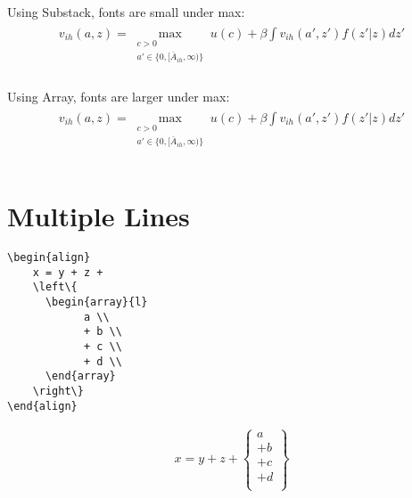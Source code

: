 \documentclass[12pt,english]{article}
\begin{document}
Using Substack, fonts are small under max:
\begin{align}
    \begin{split}
        \label{eq:Value}
        v_{ih}\left(a,z\right)
        =
        \max_{
            \substack{
                c>0\\
                a' \in \{0,[\bar{A}_{ih},\infty)\}
                }
            }
        u\left(c\right)+  \beta \int v_{ih}\left(a',z'\right)f(z'|z)dz'\\
    \end{split}
\end{align}

Using Array, fonts are larger under max:
\begin{align}
    \begin{split}
        \label{eq:Value}
        v_{ih}\left(a,z\right)
        =
        \max_{
            \begin{array}{cc}
                c>0\\
                a' \in \{0,[\bar{A}_{ih},\infty)\}\\
            \end{array}
            }
        u\left(c\right)+  \beta \int v_{ih}\left(a',z'\right)f(z'|z)dz'\\
    \end{split}
\end{align}

\pagebreak

\section{Multiple Lines}

\begin{verbatim}
\begin{align}
    x = y + z +
    \left\{
      \begin{array}{l}
            a \\
            + b \\
            + c \\
            + d \\
      \end{array}
    \right\}
\end{align}
\end{verbatim}

\begin{align}
    x = y + z +
    \left\{
      \begin{array}{l}
            a \\
            + b \\
            + c \\
            + d \\
      \end{array}
    \right\}
\end{align}
\end{document}
